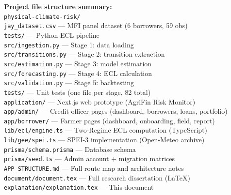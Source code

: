 \documentclass[12pt,a4paper]{article}
\begin{document}
\vspace{1cm}

\begin{infobox}
  \textbf{Project file structure summary:}\\[4pt]
  \texttt{physical-climate-risk/}\\
  \quad \texttt{jay\_dataset.csv} --- MFI panel dataset (6 borrowers, 59 obs)\\[4pt]
  \quad \texttt{tests/} --- Python ECL pipeline\\
  \quad\quad \texttt{src/ingestion.py} --- Stage 1: data loading\\
  \quad\quad \texttt{src/transitions.py} --- Stage 2: transition extraction\\
  \quad\quad \texttt{src/estimation.py} --- Stage 3: model estimation\\
  \quad\quad \texttt{src/forecasting.py} --- Stage 4: ECL calculation\\
  \quad\quad \texttt{src/validation.py} --- Stage 5: backtesting\\
  \quad\quad \texttt{tests/} --- Unit tests (one file per stage, 82 total)\\[4pt]
  \quad \texttt{application/} --- Next.js web prototype (AgriFin Risk Monitor)\\
  \quad\quad \texttt{app/admin/} --- Credit officer pages (dashboard, borrowers, loans, portfolio)\\
  \quad\quad \texttt{app/borrower/} --- Farmer pages (dashboard, onboarding, field, report)\\
  \quad\quad \texttt{lib/ecl/engine.ts} --- Two-Regime ECL computation (TypeScript)\\
  \quad\quad \texttt{lib/gee/spei.ts} --- SPEI-3 implementation (Open-Meteo archive)\\
  \quad\quad \texttt{prisma/schema.prisma} --- Database schema\\
  \quad\quad \texttt{prisma/seed.ts} --- Admin account + migration matrices\\
  \quad\quad \texttt{APP\_STRUCTURE.md} --- Full route map and architecture notes\\[4pt]
  \quad \texttt{document/document.tex} --- Full research dissertation (LaTeX)\\
  \quad \texttt{explanation/explanation.tex} --- This document
\end{infobox}
\end{document}
